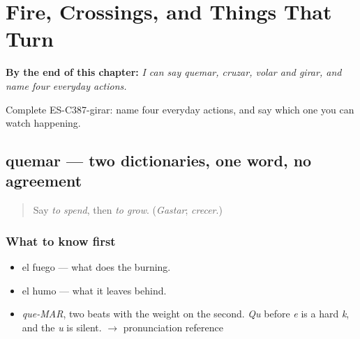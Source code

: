 
\chapter{Fire, Crossings, and Things That Turn}
\label{ch:quemar-y-cruzar}

\begin{chapteropening}
\textbf{By the end of this chapter:} \emph{I can say quemar, cruzar, volar and girar, and name four everyday actions.}

Complete ES-C387-girar: name four everyday actions, and say which one you can watch happening.
\end{chapteropening}

\section[quemar]{quemar — two dictionaries, one word, no agreement}

\label{lesson:ES-C387-quemar}



\begin{quote}
Say \emph{to spend}, then \emph{to grow}. (\emph{Gastar}; \emph{crecer}.)
\end{quote}

\subsection*{What to know first}
\begin{itemize}
\raggedright
  \item el fuego — what does the burning.
  \item el humo — what it leaves behind.
\end{itemize}

\begin{sounds}
\begin{itemize}
\raggedright
  \item \emph{que-MAR}, two beats with the weight on the second. \emph{Qu} before \emph{e} is a hard \emph{k}, and the \emph{u} is silent. $\to$ pronunciation reference
\end{itemize}
\end{sounds}

